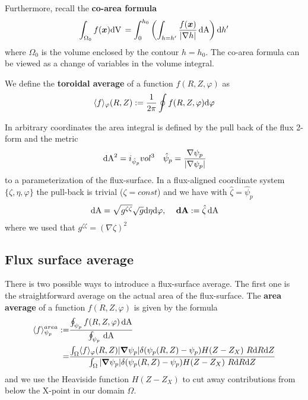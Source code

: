 Furthermore, recall the {\bf co-area formula}
\begin{align} \label{eq:coarea}
\int_{\Omega_0} f({\boldsymbol{x}}) \mathrm{dV}\, =
\int_0^{h_0} \left( \int_{h=h'} \frac{f({\boldsymbol{x}})}{|\nabla h|}  \,\mathrm{dA}  \right) \mathrm{d} h'
\end{align}
where $\Omega_0$ is the volume enclosed by the contour $h=h_0$.
The co-area formula can be viewed as a change of variables in the
volume integral.

We define the {\bf toroidal average} of a function $f(R,Z,\varphi)$ as
\begin{align} \label{eq:phi_average}
\langle f\rangle_\varphi(R,Z) := \frac{1}{2\pi}\oint f(R,Z,\varphi)\mathrm{d} \varphi
\end{align}

In arbitrary coordinates the area integral is defined by the pull back
of the flux 2-form and the metric
\begin{align}
\label{}
\,\mathrm{dA}^2 = i_{\hat \psi_p} vol^3 \quad \hat \psi_p = \frac{\nabla \psi_p}{|\nabla \psi_p|}
\end{align}
to a parameterization of the flux-surface.
In a flux-aligned coordinate system $\{\zeta, \eta, \varphi\}$ the pull-back is trivial ($\zeta=const$) and we have with $\hat\zeta = \hat \psi_p$
\begin{align}
\,\mathrm{dA} = \sqrt{g^{\zeta\zeta}} \sqrt{g} \mathrm{d}\eta\mathrm{d}\varphi, \quad {\boldsymbol{\,\mathrm{dA}}} := \hat\zeta \,\mathrm{dA}
\label{}
\end{align}
where we used that $g^{\zeta\zeta} = (\nabla\zeta)^2$

\subsection{Flux surface average}

There is two possible ways to introduce a flux-surface average.
The first one is the straightforward average on the actual area of the
flux-surface.
The {\bf area average}
of a function $f(R,Z,\varphi)$ is given by the formula
\begin{align}\label{eq:fsa_area}
\langle f \rangle^{area}_{\psi_{p}} :=&
\frac{ \oint_{\psi_p  } f(R,Z,\varphi)\,\mathrm{dA}}{\oint_{\psi_p } \,\mathrm{dA}} \nonumber \\
=& \frac{\int_\Omega \langle f\rangle_\varphi(R,Z) |{\boldsymbol{\nabla}}\psi_p| \delta(\psi_p(R,Z)-\psi_{p})H(Z-Z_X)\ R \mathrm{d} R \mathrm{d} Z}
{\int_\Omega |{\boldsymbol{\nabla}}\psi_p|\delta(\psi_p(R,Z)-\psi_{p})H(Z-Z_X)\ R \mathrm{d} R \mathrm{d} Z} \nonumber\\
\end{align}
and we use the Heaviside function $H(Z-Z_X)$ to cut away contributions from below the X-point
in our domain $\Omega$.

